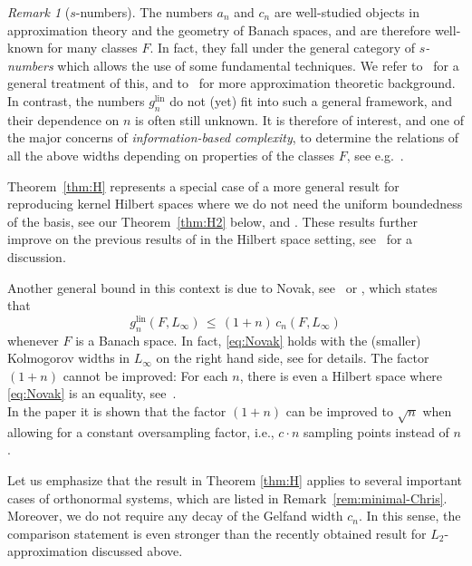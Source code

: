 \documentclass[a4paper,12pt]{amsart}
\theoremstyle{definition}
\theoremstyle{remark}
\newtheorem{remark}[theorem]{Remark}
\newcommand{\lin}{\ensuremath{\mathrm{lin}}}
\begin{document}
\begin{remark}[$s$-numbers]%
The numbers 
$a_n$ and $c_n$ 
are well-studied objects in approximation theory and 
the geometry of Banach spaces, and are therefore well-known 
for many classes $F$. 
In fact, they fall under the general category of \emph{$s$-numbers} 
which allows the use of some fundamental techniques. 
We refer to~\cite{Diestel-book,Pietsch-s} for a general treatment of this, 
and to~\cite{DTU18,KKLT,Tem18} for more approximation theoretic 
background. \\
In contrast, the numbers $g_n^\lin$ 
do not (yet) 
fit into such a general framework, and their dependence on $n$ is 
often still unknown. 
It is therefore of interest, and one of the 
major concerns of 
\emph{information-based complexity}, 
to determine the relations of all the above widths depending on 
properties of the classes $F$, 
see e.g.~\cite{NW1,NW3,TWW88}. 
\end{remark}


Theorem~\ref{thm:H} 
represents a special case of a more general result for reproducing kernel Hilbert spaces 
where we do not need the uniform boundedness of the basis, see our Theorem~\ref{thm:H2} below, 
and \cite[Thm.~2.1]{GW23}.
These results further improve on the previous results of \cite{KWW08} in the Hilbert space setting, 
see~\cite[Sect.~5]{PU} for a discussion.

Another general bound in this context is due to Novak, see~\cite[Prop.~1.2.5]{Novak} or \cite[Thm.~29.7]{NW3}, 
which states that 
\begin{equation}\label{eq:Novak}
g_n^\lin(F,L_\infty) 
 \,\le\, (1+n)\,c_n(F,L_\infty)
\end{equation}
whenever $F$ is a Banach space. 
In fact, \eqref{eq:Novak} holds with the (smaller) Kolmogorov widths in $L_\infty$ on the right hand side, see \cite{Novak,NW3} for details. 
The factor $(1+n)$ cannot be improved:
For each $n$, there is even a Hilbert space  where \eqref{eq:Novak} is an equality, 
see~\cite[Example~29.8]{NW3}. \\

In the paper \cite{KPUU23_2} it is shown that the factor $(1+n)$ can be improved to $\sqrt{n}$ when allowing for a constant oversampling factor, i.e., $c\cdot n$ sampling points 
instead of $n$. 

Let us emphasize  that the result in Theorem \ref{thm:H} applies to several important 
cases of orthonormal systems, which are listed in Remark~\ref{rem:minimal-Chris}. 
Moreover, 
we do not require any 
decay of the Gelfand width $c_n$.
In this %
sense, the comparison statement is even stronger than the recently obtained 
result for $L_2$-approximation {discussed above}. 
\end{document}
